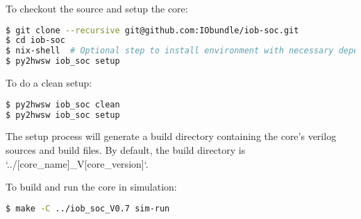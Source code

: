 %

To checkout the source and setup the core:

\begin{lstlisting}[language=bash]
$ git clone --recursive git@github.com:IObundle/iob-soc.git
$ cd iob-soc
$ nix-shell  # Optional step to install environment with necessary dependencies
$ py2hwsw iob_soc setup
\end{lstlisting}

To do a clean setup:

\begin{lstlisting}[language=bash]
$ py2hwsw iob_soc clean
$ py2hwsw iob_soc setup
\end{lstlisting}

The setup process will generate a build directory containing the core's verilog sources and build files.
By default, the build directory is `../[core\_name]\_V[core\_version]`.

To build and run the core in simulation:
\begin{lstlisting}[language=bash]
$ make -C ../iob_soc_V0.7 sim-run
\end{lstlisting}
